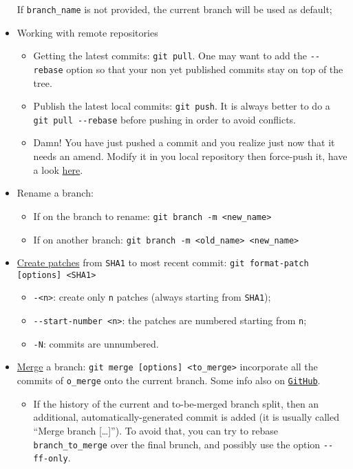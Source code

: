 \documentclass[a4paper,12pt,%
              final%
              ]{article}
\begin{document}
\begin{itemize}
    If \verb|branch_name| is not provided, the current branch will be used as default;
  \item Working with remote repositories
    \begin{itemize}
      \item Getting the latest commits: \verb|git pull|. One may want to add the \verb|--rebase| option so that your non yet published commits stay on top of the tree.
      \item Publish the latest local commits: \verb|git push|. It is always better to do a \verb|git pull --rebase| before pushing in order to avoid conflicts.
      \item Damn! You have just pushed a commit and you realize just now that it needs an amend. Modify it in you local repository then force-push it, have a look \href{https://stackoverflow.com/questions/179123/how-to-modify-existing-unpushed-commit-messages}{here}.
    \end{itemize}
  \item Rename a branch:
    \begin{itemize}
      \item If on the branch to rename: \verb|git branch -m <new_name>|
      \item If on another branch: \verb|git branch -m <old_name> <new_name>|
    \end{itemize}
  \item \href{https://git-scm.com/docs/git-format-patch}{Create patches} from \texttt{SHA1} to most recent commit: \verb|git format-patch [options] <SHA1>|
    \begin{itemize}
      \item \texttt{-<n>}: create only \texttt{n} patches (always starting from \texttt{SHA1});
      \item \verb|--start-number <n>|: the patches are numbered starting from \texttt{n};
      \item \texttt{-N}: commits are unnumbered.
    \end{itemize}
  \item \href{https://git-scm.com/docs/git-merge}{Merge} a branch: \verb|git merge [options] <to_merge>| incorporate all the commits of \verb|o_merge| onto the current branch. Some info also on \href{https://docs.github.com/en/github/collaborating-with-issues-and-pull-requests/about-pull-request-merges}{\texttt{GitHub}}.
    \begin{itemize}
      \item If the history of the current and to-be-merged branch split, then an additional, automatically-generated commit is added (it is usually called ``Merge branch [\ldots]''). To avoid that, you can try to rebase \verb|branch_to_merge| over the final brunch, and possibly use the option \verb|--ff-only|.

\end{itemize}
\end{itemize}
\end{document}
